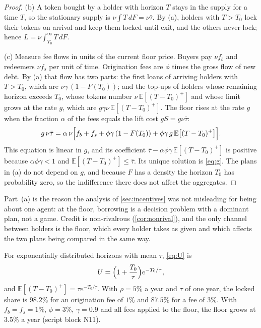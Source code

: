 \begin{proof}
(b) A token bought by a holder with horizon $T$ stays in the supply for a time $T$, so the stationary supply is $\nu\int T\,dF=\nu\bar\tau$. By (a), holders with $T>T_0$ lock their tokens on arrival and keep them locked until exit, and the others never lock; hence $L=\nu\int_{T_0}^\infty T\,dF$.

(c) Measure fee flows in units of the current floor price. Buyers pay $\nu f_b$ and redeemers $\nu f_s$ per unit of time. Origination fees are $\phi$ times the gross flow of new debt. By (a) that flow has two parts: the first loans of arriving holders with $T>T_0$, which are $\nu\gamma\,(1-F(T_0))$; and the top-ups of holders whose remaining horizon exceeds $T_0$, whose tokens number $\nu\,\mathbb E[(T-T_0)^+]$ and whose limit grows at the rate $g$, which are $g\gamma\nu\,\mathbb E[(T-T_0)^+]$. The floor rises at the rate $g$ when the fraction $\alpha$ of the fees equals the lift cost $gS=g\nu\bar\tau$:
\[
g\,\nu\bar\tau=\alpha\,\nu\Bigl[f_b+f_s+\phi\gamma\,(1-F(T_0))+\phi\gamma\,g\,\mathbb E\bigl[(T-T_0)^+\bigr]\Bigr].
\]
This equation is linear in $g$, and its coefficient $\bar\tau-\alpha\phi\gamma\,\mathbb E[(T-T_0)^+]$ is positive because $\alpha\phi\gamma<1$ and $\mathbb E[(T-T_0)^+]\le\bar\tau$. Its unique solution is \eqref{eq:g}. The plans in (a) do not depend on $g$, and because $F$ has a density the horizon $T_0$ has probability zero, so the indifference there does not affect the aggregates.
\end{proof}

Part~(a) is the reason the analysis of \cref{sec:incentives} was not misleading for being about one agent: at the floor, borrowing is a decision problem with a dominant plan, not a game. Credit is non-rivalrous (\cref{cor:nonrival}), and the only channel between holders is the floor, which every holder takes as given and which affects the two plans being compared in the same way.

For exponentially distributed horizons with mean $\tau$, \eqref{eq:U} is
\begin{equation}\label{eq:Uexp}
U=\Bigl(1+\frac{T_0}\tau\Bigr)e^{-T_0/\tau},
\end{equation}
and $\mathbb E[(T-T_0)^+]=\tau e^{-T_0/\tau}$. With $\rho=5\%$ a year and $\tau$ of one year, the locked share is $98.2\%$ for an origination fee of $1\%$ and $87.5\%$ for a fee of $3\%$. With $f_b=f_s=1\%$, $\phi=3\%$, $\gamma=0.9$ and all fees applied to the floor, the floor grows at $3.5\%$ a year (script block N11).

